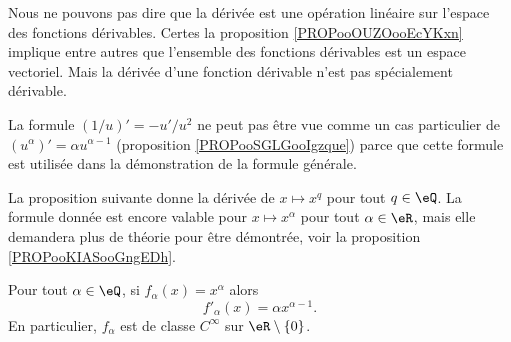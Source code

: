 \begin{remark}
    Nous ne pouvons pas dire que la dérivée est une opération linéaire sur l'espace des fonctions dérivables. Certes la proposition \ref{PROPooOUZOooEcYKxn} implique entre autres que l'ensemble des fonctions dérivables est un espace vectoriel. Mais la dérivée d'une fonction dérivable n'est pas spécialement dérivable.
\end{remark}

\begin{remark}
    La formule \( (1/u)'=-u'/u^2\) ne peut pas être vue comme un cas particulier de \( (u^{\alpha})'=\alpha u^{\alpha-1}\) (proposition \ref{PROPooSGLGooIgzque}) parce que cette formule est utilisée dans la démonstration de la formule générale.
\end{remark}

La proposition suivante donne la dérivée de \( x\mapsto x^q\) pour tout \( q\in \eQ\). La formule donnée est encore valable pour \( x\mapsto x^{\alpha}\) pour tout \( \alpha\in \eR\), mais elle demandera plus de théorie pour être démontrée, voir la proposition \ref{PROPooKIASooGngEDh}.
\begin{proposition}     \label{PROPooSGLGooIgzque}
    Pour tout \( \alpha\in \eQ\), si \( f_{\alpha}(x)=x^{\alpha}\) alors
    \begin{equation}
        f'_{\alpha}(x)=\alpha x^{\alpha-1}.
    \end{equation}
    En particulier, \( f_{\alpha}\) est de classe \(  C^{\infty}\) sur \( \eR\setminus\{ 0 \}\).
\end{proposition}

